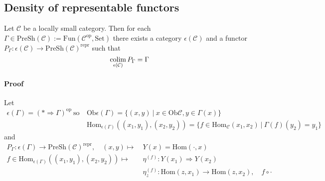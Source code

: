 
\subsection{Density of representable functors}
Let $\mathcal{C}$ be a locally small category. 
Then for each $\Gamma \in \mathrm{PreSh}(\mathcal{C}) := \mathrm{Fun}(\mathcal{C}^{\mathrm{op}}, \mathrm{Set})$ there exists a category $\epsilon(\mathcal{C})$ and a functor $P_\Gamma: \epsilon(\mathcal{C}) \to \mathrm{PreSh}(\mathcal{C})^{\mathrm{repr}}$ such that
\begin{equation*}
    \operatorname*{colim}_{\epsilon(\mathcal{C})} P_\Gamma = \Gamma
\end{equation*}
\paragraph{Proof} Let
\begin{align*}
    \epsilon(\Gamma) = (* \Rightarrow \Gamma)^{\mathrm{op}} \ \text{so} \ &\mathrm{Ob}\epsilon(\Gamma) = \{ (x, y) \ | \ x \in \mathrm{Ob}\mathcal{C}, y \in \Gamma(x)\} \\
    &\mathrm{Hom}_{\epsilon(\Gamma)}((x_1, y_1), (x_2, y_2)) = \{ f \in \mathrm{Hom}_{\mathcal{C}}(x_1, x_2) \ | \ \Gamma(f)(y_2) = y_1 \}
\end{align*}
and
\begin{align*}
    P_\Gamma: \epsilon(\Gamma) \to \mathrm{PreSh}(\mathcal{C})^{\mathrm{repr}}, \quad (x, y) \mapsto \ &Y(x) = \mathrm{Hom}(\cdot, x) \\
    f \in \mathrm{Hom}_{\epsilon(\Gamma)}((x_1, y_1), (x_2, y_2)) \mapsto \ &\eta^{(f)}: Y(x_1) \Rightarrow Y(x_2) \\
    &\eta^{(f)}_z: \mathrm{Hom}(z, x_1) \to \mathrm{Hom}(z, x_2), \quad f \circ \cdot
\end{align*}
